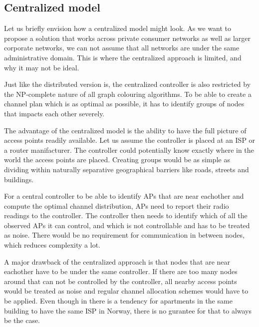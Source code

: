 \subsection{Centralized model}
Let us briefly envision how a centralized model might look. As we want to propose a solution that works across private consumer networks as well as larger corporate networks,
we can not assume that all networks are under the same administrative domain. This is where the centralized approach is limited, and why it may not be ideal.

Just like the distributed version is, the centralized controller is also restricted by the NP-complete nature of all graph colouring algorithms.
To be able to create a channel plan which is as optimal as possible, it has to identify groups of nodes that impacts each other severely. 

The advantage of the centralized model is the ability to have the full picture of access points readily available. Let us assume the controller is placed at an ISP or a router manifacturer.
The controller could potentially know exactly where in the world the access points are placed. Creating groups would
be as simple as dividing within naturally separative geographical barriers like roads, streets and buildings. 

For a central controller to be able to identify APs that are near eachother and compute the optimal channel distribution, APs need to report their radio readings to the controller. 
The controller then needs to identify which of all the observed APs it can control, and which is not controllable and has to be treated as noise. There would be no requirement for
communication in between nodes, which reduces complexity a lot.  

A major drawback of the centralized approach is that nodes that are near eachother have to be under the same controller. If there are too many nodes around
that can not be controlled by the controller, all nearby access points would be treated as noise and regular channel allocation schemes would have to be applied.
Even though in there is a tendency for apartments in the same building to have the same ISP in Norway, there is no gurantee for that to always be the case.  

